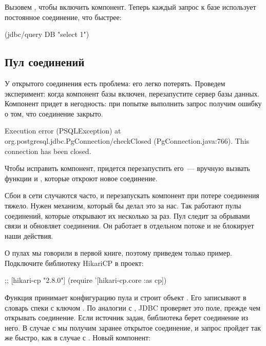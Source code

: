 Вызовем , чтобы включить компонент. Теперь каждый запрос к базе использует постоянное соединение, что быстрее:

\begin{english}
  \begin{clojure}
(jdbc/query DB "select 1")
  \end{clojure}
\end{english}

\subsection{Пул соединений}

У открытого соединения есть проблема: его легко потерять. Проведем эксперимент: когда компонент базы включен, перезапустите сервер базы данных. Компонент придет в негодность: при попытке выполнить запрос получим ошибку о том, что соединение закрыто.

\begin{english}
  \begin{clojure}
Execution error (PSQLException) at org.postgresql.jdbc.PgConnection/checkClosed (PgConnection.java:766).
This connection has been closed.
  \end{clojure}
\end{english}

Чтобы исправить компонент, придется перезапустить его~--- вручную вызвать функции  и , которые откроют новое соединение.

Сбои в сети случаются часто, и перезапускать компонент при потере соединения тяжело. Нужен механизм, который бы делал это за нас. Так работают пулы соединений, которые открывают их несколько за раз. Пул следит за обрывами связи и обновляет соединения. Он работает в отдельном потоке и не блокирует наши действия.

О пулах мы говорили в первой книге, поэтому приведем только пример. Подключите библиотеку HikariCP в проект:

\begin{english}
  \begin{clojure}
;; [hikari-cp "2.8.0"]
(require '[hikari-cp.core :as cp])
  \end{clojure}
\end{english}

Функция  принимает конфигурацию пула и строит объект . Его записывают в словарь спеки с ключом . По аналогии с , JDBC проверяет это поле, прежде чем открывать соединение. Если источник задан, библиотека берет соединение из него. В случае с  мы получим заранее открытое соединение, и запрос пройдет так же быстро, как в случае с . Новый компонент:

